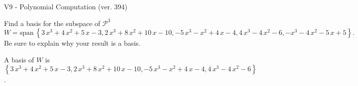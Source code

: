 \begin{exercise}
  \begin{exerciseTitle}V9 - Polynomial Computation (ver. 394)\end{exerciseTitle}
  \begin{exerciseStatement}
    Find a basis for the subspace of \(\mathcal{P}^3\) 
\[W=\mathrm{span}\ \left\{3 \, x^{3} + 4 \, x^{2} + 5 \, x - 3 , 2 \, x^{3} + 8 \, x^{2} + 10 \, x - 10 , -5 \, x^{3} - x^{2} + 4 \, x - 4 , 4 \, x^{3} - 4 \, x^{2} - 6 , -x^{3} - 4 \, x^{2} - 5 \, x + 5\right\}.\]
 Be sure to explain why your result is a basis.


  \end{exerciseStatement}
  \begin{exerciseAnswer}
   A basis of \(W\) is  \(\left\{3 \, x^{3} + 4 \, x^{2} + 5 \, x - 3 , 2 \, x^{3} + 8 \, x^{2} + 10 \, x - 10 , -5 \, x^{3} - x^{2} + 4 \, x - 4 , 4 \, x^{3} - 4 \, x^{2} - 6\right\}\).
  


  \end{exerciseAnswer}
\end{exercise}